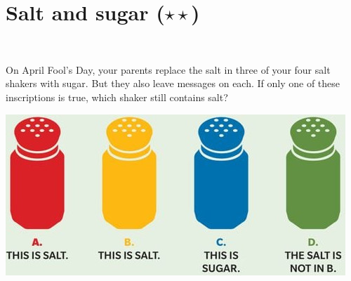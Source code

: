 \documentclass[11pt]{article}
\begin{document}
\section{Salt and sugar ($\star\star$)}~\\[-12mm]
\begin{minipage}{.5\textwidth}
  On April Fool’s Day, your parents replace the salt in three of your four
  salt shakers with sugar. But they also leave messages on each.
  If only one of these inscriptions is true, which shaker still contains salt?
\end{minipage}
\begin{minipage}{.5\textwidth}
\begin{center}
  \includegraphics[width=\textwidth]{salt.jpg}
\end{center}
\end{minipage}
\end{document}
